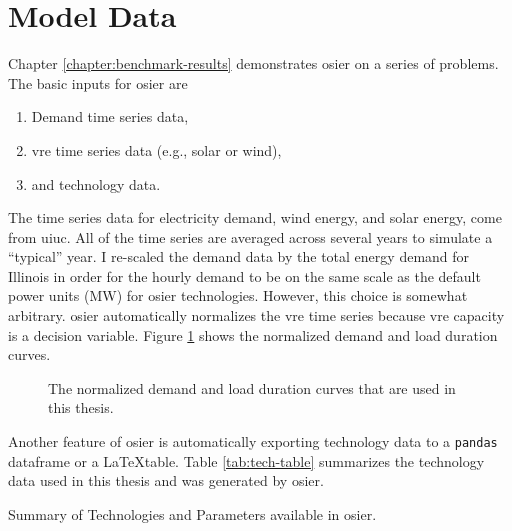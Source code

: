 \section{Model Data}

Chapter \ref{chapter:benchmark-results} demonstrates \ac{osier} on a series of
problems. The basic inputs for \ac{osier} are
\begin{enumerate}
    \item Demand time series data,
    \item \ac{vre} time series data (e.g., solar or wind),
    \item and technology data.
\end{enumerate}
\noindent
The time series data for electricity demand, wind energy, and solar energy, come
from \ac{uiuc}. All of the time series are averaged across several years to
simulate a ``typical'' year. I re-scaled the demand data by the total energy
demand for Illinois in order for the hourly demand to be on the same scale as
the default power units (MW) for \ac{osier} technologies. However, this choice
is somewhat arbitrary. \ac{osier} automatically normalizes the \ac{vre} time
series because \ac{vre} capacity is a decision variable. Figure
\ref{fig:normalized_ldc} shows the normalized demand and load duration curves.


 \begin{figure}[h]
  \centering
  \resizebox{1\columnwidth}{!}{}
  \caption{The normalized demand and load duration curves that are used in this thesis.}
  \label{fig:normalized_ldc}
\end{figure}

\noindent
Another feature of \ac{osier} is automatically exporting technology data to a
\texttt{pandas} dataframe or a \LaTeX table. Table \ref{tab:tech-table}
summarizes the technology data used in this thesis and was generated by
\ac{osier}. 



\begin{sidewaystable}[!ht]
  \centering
  \caption{Summary of Technologies and Parameters available in \ac{osier}.}
  \label{tab:tech-table}
  \resizebox{\textheight}{!}{
  
  } %
\end{sidewaystable}